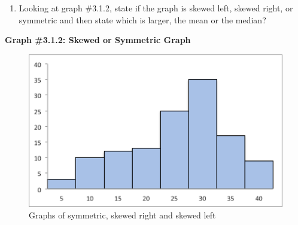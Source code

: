 \documentclass[
]{book}
\providecommand{\tightlist}{%
  \setlength{\itemsep}{0pt}\setlength{\parskip}{0pt}}
\begin{document}
\begin{enumerate}
\def\labelenumi{\arabic{enumi}.}
\setcounter{enumi}{5}
\tightlist
\item
  Looking at graph \#3.1.2, state if the graph is skewed left, skewed right, or symmetric and then state which is larger, the mean or the median?
\end{enumerate}

\textbf{Graph \#3.1.2: Skewed or Symmetric Graph}

\begin{figure}
\centering
\includegraphics{graph_3_1_2.png}
\caption{Graphs of symmetric, skewed right and skewed left}
\end{figure}
\end{document}
